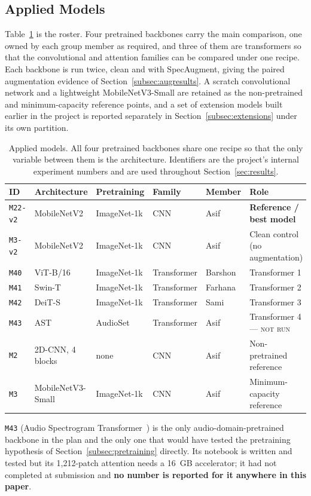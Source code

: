 \documentclass[journal,onecolumn]{IEEEtran}
\newcommand{\best}[1]{\textbf{#1}}
\newcommand{\notrun}{\textsc{not run}}
\begin{document}
\subsection{Applied Models}
\label{subsec:models}

Table~\ref{tab:models} is the roster. Four pretrained backbones carry the main
comparison, one owned by each group member as required, and three of them are
transformers so that the convolutional and attention families can be compared
under one recipe. Each backbone is run twice, clean and with SpecAugment, giving
the paired augmentation evidence of Section~\ref{subsec:augresults}. A scratch
convolutional network and a lightweight MobileNetV3-Small are retained as the
non-pretrained and minimum-capacity reference points, and a set of extension
models built earlier in the project is reported separately in
Section~\ref{subsec:extensions} under its own partition.

\begin{table}[!t]
\centering
\caption{Applied models. All four pretrained backbones share one recipe so that
the only variable between them is the architecture. Identifiers are the
project's internal experiment numbers and are used throughout
Section~\ref{sec:results}.}
\label{tab:models}
\small
\begin{tabular}{llllll}
\toprule
ID & Architecture & Pretraining & Family & Member & Role \\
\midrule
\texttt{M22-v2} & MobileNetV2~\cite{sandler2018mobilenetv2} & ImageNet-1k & CNN & Asif & \best{Reference / best model} \\
\texttt{M3-v2}  & MobileNetV2       & ImageNet-1k & CNN         & Asif    & Clean control (no augmentation) \\
\texttt{M40}    & ViT-B/16~\cite{dosovitskiy2021vit} & ImageNet-1k & Transformer & Barshon & Transformer 1 \\
\texttt{M41}    & Swin-T~\cite{liu2021swin} & ImageNet-1k & Transformer & Farhana & Transformer 2 \\
\texttt{M42}    & DeiT-S~\cite{touvron2021deit} & ImageNet-1k & Transformer & Sami & Transformer 3 \\
\texttt{M43}    & AST               & AudioSet    & Transformer & Asif    & Transformer 4 --- \notrun \\
\texttt{M2}     & 2D-CNN, 4 blocks  & none        & CNN         & Asif    & Non-pretrained reference \\
\texttt{M3}     & MobileNetV3-Small & ImageNet-1k & CNN         & Asif    & Minimum-capacity reference \\
\bottomrule
\end{tabular}

\vspace{2pt}
\footnotesize \texttt{M43} (Audio Spectrogram Transformer~\cite{gong2021ast}) is
the only audio-domain-pretrained backbone in the plan and the only one that would
have tested the pretraining hypothesis of
Section~\ref{subsec:pretraining} directly. Its notebook is written and tested but
its 1{,}212-patch attention needs a 16~GB accelerator; it had not completed at
submission and \textbf{no number is reported for it anywhere in this paper}.
\end{table}
\end{document}
